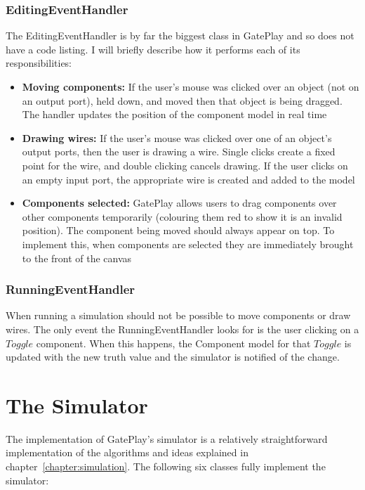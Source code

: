 \subsubsection{EditingEventHandler}
The EditingEventHandler is by far the biggest class in GatePlay and so does not have a code listing. I will briefly describe how it performs each of its responsibilities:

\begin{itemize}
	\item \textbf{Moving components:} If the user's mouse was clicked over an object (not on an output port), held down, and moved then that object is being dragged. The handler updates the position of the component model in real time
	
	\item \textbf{Drawing wires:} If the user's mouse was clicked over one of an object's output ports, then the user is drawing a wire. Single clicks create a fixed point for the wire, and double clicking cancels drawing. If the user clicks on an empty input port, the appropriate wire is created and added to the model
	
	\item \textbf{Components selected:} GatePlay allows users to drag components over other components temporarily (colouring them red to show it is an invalid position). The component being moved should always appear on top. To implement this, when components are selected they are immediately brought to the front of the canvas 
\end{itemize}

\subsubsection{RunningEventHandler}
When running a simulation should not be possible to move components or draw wires. The only event the RunningEventHandler looks for is the user clicking on a $Toggle$ component. When this happens, the Component model for that $Toggle$ is updated with the new truth value and the simulator is notified of the change.

\section{The Simulator}
\label{section:simulator}
The implementation of GatePlay's simulator is a relatively straightforward implementation of the algorithms and ideas explained in chapter~\ref{chapter:simulation}. The following six classes fully implement the simulator:

